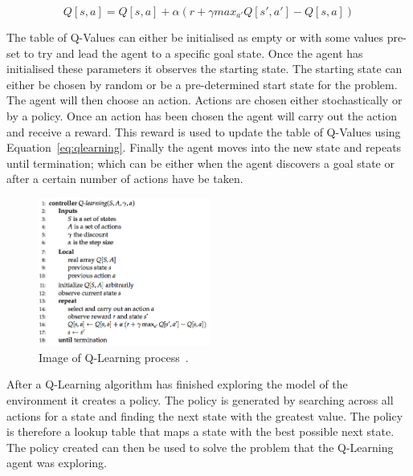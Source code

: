 \begin{equation} \label{eq:qlearning}
Q[s,a] = Q[s,a] + {\alpha}(r+ {\gamma}max_{a'} Q[s',a'] - Q[s,a])
\end{equation}

The table of Q-Values can either be initialised as empty or with some values pre-set to try and lead the agent to a specific goal state. Once the agent has initialised these parameters it observes the starting state. The starting state can either be chosen by random or be a pre-determined start state for the problem. The agent will then choose an action. Actions are chosen either stochastically or by a policy. Once an action has been chosen the agent will carry out the action and receive a reward. This reward is used to update the table of Q-Values using Equation~\ref{eq:qlearning}. Finally the agent moves into the new state and repeats until termination; which can be either when the agent discovers a goal state or after a certain number of actions have be taken.

\begin{figure}[H]
  \begin{center}
    	  \includegraphics[width=0.5\textwidth]{figures/q-learning.jpg}
    \end{center}
    \caption{Image of Q-Learning process~\cite{poole2010artificial}.}
    \label{fig:qlearning}
\end{figure}

After a Q-Learning algorithm has finished exploring the model of the environment it creates a policy. The policy is generated by searching across all actions for a state and finding the next state with the greatest value. The policy is therefore a lookup table that maps a state with the best possible next state. The policy created can then be used to solve the problem that the Q-Learning agent was exploring.~\cite{poole2010artificial}